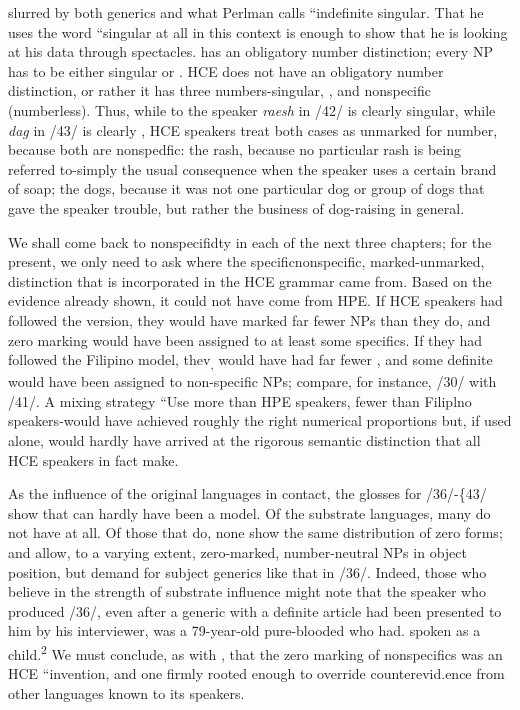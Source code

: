 slurred by both generics and what Perlman calls ``indefinite singular. That he uses the word ``singular at all in this context is enough to show that he is looking at his data through  spectacles.  has an obligatory number distinction; every NP has to be either singular or . HCE does not have an obligatory number distinction, or rather it has three numbers-singular, , and nonspecific (number\-less). Thus, while to the  speaker \textit{raesh} in /42/ is clearly singular, while \textit{d}\textit{ag} in /43/ is clearly , HCE speakers treat both cases as unmarked for number, because both are nonspedfic: the rash, because no particular rash is being referred to-simply the usual consequence when the speaker uses a certain brand of soap; the dogs, because it was not one particular dog or group of dogs that gave the speaker trouble, but rather the business of dog-raising in general.

We shall come back to nonspecifidty in each of the next three chapters; for the present, we only need to ask where the specific\-nonspecific, marked-unmarked, distinction that is incorporated in the HCE grammar came from. Based on the evidence already shown, it could not have come from HPE. If HCE speakers had followed the  version, they would have marked far fewer NPs than they do, and zero marking would have been assigned to at least some specifics. If they had followed the Filipino model, thev\textsubscript{,}\textsubscript{ }would have had far fewer \zeros, and some definite  would have been assigned to non-specific NPs; compare, for instance, /30/ with /41/. A mixing strategy\- ``Use more  than  HPE speakers, fewer than Filiplno speakers{\textquotedbl}-would have achieved roughly the right numerical propor\-tions but, if used alone, would hardly have arrived at the rigorous semantic distinction that all HCE speakers in fact make.

As the influence of the original languages in contact, the glosses for /36/-\{43/ show that  can hardly have been a model. Of the substrate languages, many do not have  at all. Of those that do, none show the same distribution of zero forms;  and  allow, to a varying extent, zero-marked, number-neutral NPs in object position, but demand  for subject generics like that in /36/. Indeed, those who believe in the strength of substrate
influence might note that the speaker who produced /36/, even after a generic with a definite article had been presented to him by his inter\-viewer, was a 79-year-old pure-blooded  who had. spoken  as a child.\textsuperscript{2} We must conclude, as with , that the zero marking of nonspecifics was an HCE ``invention, and one firmly rooted enough to override counterevid.ence from other languages known to its speakers.

